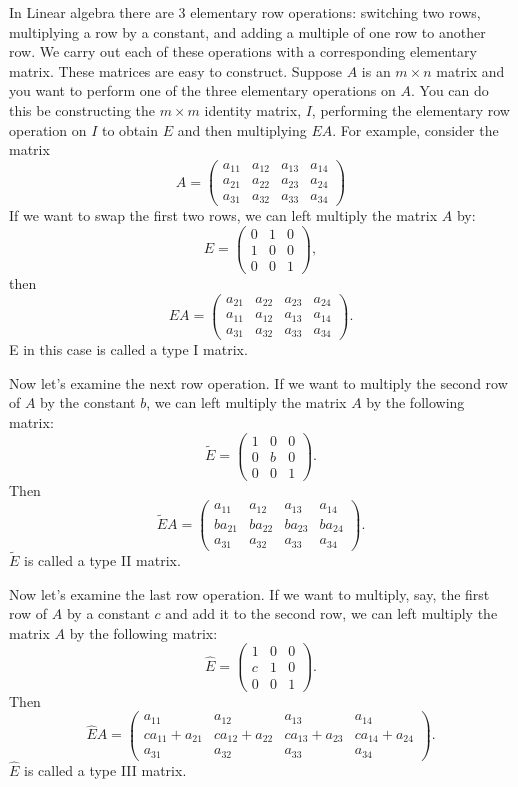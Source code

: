 \label{lab:LUdecomp}

In Linear algebra there are 3 elementary row operations: switching two rows, multiplying a row by a constant, and adding a multiple of one row to another row.
We carry out each of these operations with a corresponding elementary matrix.
These matrices are easy to construct.
Suppose $A$ is an $m \times n$ matrix and you want to perform one of the three elementary operations on $A$.
You can do this be constructing the $m \times m$ identity matrix, $I$, performing the elementary row operation on $I$ to obtain $E$ and then multiplying $EA$.
For example, consider the matrix
\[
A = \begin{pmatrix}
a_{11}&a_{12}&a_{13}&a_{14}\\
a_{21}&a_{22}&a_{23}&a_{24}\\
a_{31}&a_{32}&a_{33}&a_{34}
\end{pmatrix}
\]
If we want to swap the first two rows, we can left multiply the
matrix $A$ by:
\[
E = \begin{pmatrix}
0&1&0\\
1&0&0\\
0&0&1
\end{pmatrix},
\]
then
\[
E A =
\begin{pmatrix}
a_{21}&a_{22}&a_{23}&a_{24}\\
a_{11}&a_{12}&a_{13}&a_{14}\\
a_{31}&a_{32}&a_{33}&a_{34}
\end{pmatrix}.
\]
E in this case is called a type I matrix.

Now let's examine the next row operation.
If we want to multiply the second row of $A$ by the constant $b$, we can left multiply the matrix $A$ by the following matrix:
\[
\tilde{E} = \begin{pmatrix}
1&0&0\\
0&b&0\\
0&0&1
\end{pmatrix}.
\]
Then
\[
\tilde{E} A =
\begin{pmatrix}
a_{11}&a_{12}&a_{13}&a_{14}\\
b a_{21}&b a_{22}&b a_{23}&b a_{24}\\
a_{31}&a_{32}&a_{33}&a_{34}
\end{pmatrix}.
\]
$\tilde{E}$ is called a type II matrix.  

Now let's examine the last row operation.
If we want to multiply, say, the first row of $A$ by a constant $c$ and add it to the second row, we can left multiply the matrix $A$ by the following matrix:
\[
\widehat{E} = \begin{pmatrix}
1&0&0\\
c&1&0\\
0&0&1
\end{pmatrix}.
\]
Then
\[
\widehat{E} A =
\begin{pmatrix}
a_{11}&a_{12}&a_{13}&a_{14}\\
c a_{11} + a_{21}&c a_{12} + a_{22}&c a_{13} + a_{23}&c a_{14} + a_{24}\\
a_{31}&a_{32}&a_{33}&a_{34}
\end{pmatrix}.
\]
$\widehat{E}$ is called a type III matrix.

